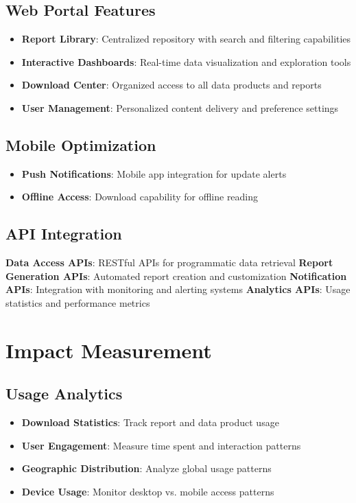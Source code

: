 \documentclass[11pt,a4paper]{article}
\begin{document}
\subsection{Web Portal Features}
\begin{itemize}
    \item \textbf{Report Library}: Centralized repository with search and filtering capabilities
    \item \textbf{Interactive Dashboards}: Real-time data visualization and exploration tools
    \item \textbf{Download Center}: Organized access to all data products and reports
    \item \textbf{User Management}: Personalized content delivery and preference settings
\end{itemize}

\subsection{Mobile Optimization}
\begin{itemize}
    \textbf{Responsive Design}: Mobile-friendly layouts for all report types
    \textbf{PDF Optimization}: Mobile-optimized PDF formatting
    \item \textbf{Push Notifications}: Mobile app integration for update alerts
    \item \textbf{Offline Access}: Download capability for offline reading
\end{itemize}

\subsection{API Integration}
\begin{itemize}
    \textbf{Data Access APIs}: RESTful APIs for programmatic data retrieval
    \textbf{Report Generation APIs}: Automated report creation and customization
    \textbf{Notification APIs}: Integration with monitoring and alerting systems
    \textbf{Analytics APIs}: Usage statistics and performance metrics
\end{itemize}

\section{Impact Measurement}

\subsection{Usage Analytics}
\begin{itemize}
    \item \textbf{Download Statistics}: Track report and data product usage
    \item \textbf{User Engagement}: Measure time spent and interaction patterns
    \item \textbf{Geographic Distribution}: Analyze global usage patterns
    \item \textbf{Device Usage}: Monitor desktop vs. mobile access patterns
\end{itemize}
\end{document}
